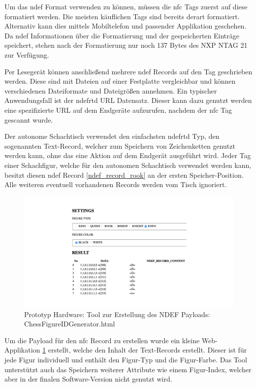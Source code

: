 Um das \gls{ndef} Format verwenden zu können, müssen die \gls{nfc} Tags
zuerst auf diese formatiert werden. Die meisten käuflichen Tags sind
bereits derart formatiert. Alternativ kann dies mittels Mobiltelefon und
passender Applikation geschehen. Da \gls{ndef} Informationen über die
Formatierung und der gespeicherten Einträge speichert, stehen nach der
Formatierung nur noch 137 Bytes des NXP NTAG 21 zur Verfügung.

Per Lesegerät können anschließend mehrere \gls{ndef} Records auf den Tag
geschrieben werden. Diese sind mit Dateien auf einer Festplatte
vergleichbar und können verschiedenen Dateiformate und Dateigrößen
annehmen. Ein typischer Anwendungsfall ist der \gls{ndefrtd} URL
Datensatz. Dieser kann dazu genutzt werden eine spezifizierte URL auf
dem Endgeräte aufzurufen, nachdem der \gls{nfc} Tag gescannt wurde.
\cite{nordicnfclibndef}

Der autonome Schachtisch verwendet den einfachsten \gls{ndefrtd} Typ,
den sogenannten Text-Record, welcher zum Speichern von Zeichenketten
genutzt werden kann, ohne das eine Aktion auf dem Endgerät ausgeführt
wird. Jeder Tag einer Schachfigur, welche für den autonomen Schachtisch
verwendet werden kann, besitzt diesen \gls{ndef} Record
\ref{ndef_record_rook} an der ersten Speicher-Position. Alle weiteren
eventuell vorhandenen Records werden vom Tisch ignoriert.
\cite{nordicnfclib}

\begin{figure}
\centering
\includegraphics{images/ATC_ChessFigureIDGenerator.png}
\caption{Prototyp Hardware: Tool zur Erstellung des NDEF Payloads:
ChessFigureIDGenerator.html \label{ATC_ChessFigureIDGenerator}}
\end{figure}

Um die Payload für den \gls{nfc} Record zu erstellen wurde ein kleine
Web-Applikation \ref{ATC_ChessFigureIDGenerator} erstellt, welche den
Inhalt der Text-Records erstellt. Dieser ist für jede Figur individuell
und enthält den Figur-Typ und die Figur-Farbe. Das Tool unterstützt auch
das Speichern weiterer Attribute wie einem Figur-Index, welcher aber in
der finalen Software-Version nicht genutzt wird.

